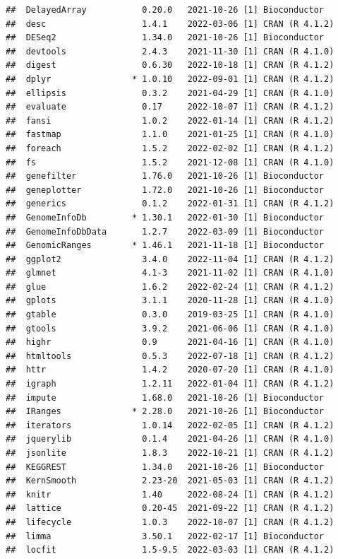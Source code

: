 \documentclass[
]{book}
\begin{document}
\begin{verbatim}
##  DelayedArray           0.20.0   2021-10-26 [1] Bioconductor
##  desc                   1.4.1    2022-03-06 [1] CRAN (R 4.1.2)
##  DESeq2                 1.34.0   2021-10-26 [1] Bioconductor
##  devtools               2.4.3    2021-11-30 [1] CRAN (R 4.1.0)
##  digest                 0.6.30   2022-10-18 [1] CRAN (R 4.1.2)
##  dplyr                * 1.0.10   2022-09-01 [1] CRAN (R 4.1.2)
##  ellipsis               0.3.2    2021-04-29 [1] CRAN (R 4.1.0)
##  evaluate               0.17     2022-10-07 [1] CRAN (R 4.1.2)
##  fansi                  1.0.2    2022-01-14 [1] CRAN (R 4.1.2)
##  fastmap                1.1.0    2021-01-25 [1] CRAN (R 4.1.0)
##  foreach                1.5.2    2022-02-02 [1] CRAN (R 4.1.2)
##  fs                     1.5.2    2021-12-08 [1] CRAN (R 4.1.0)
##  genefilter             1.76.0   2021-10-26 [1] Bioconductor
##  geneplotter            1.72.0   2021-10-26 [1] Bioconductor
##  generics               0.1.2    2022-01-31 [1] CRAN (R 4.1.2)
##  GenomeInfoDb         * 1.30.1   2022-01-30 [1] Bioconductor
##  GenomeInfoDbData       1.2.7    2022-03-09 [1] Bioconductor
##  GenomicRanges        * 1.46.1   2021-11-18 [1] Bioconductor
##  ggplot2                3.4.0    2022-11-04 [1] CRAN (R 4.1.2)
##  glmnet                 4.1-3    2021-11-02 [1] CRAN (R 4.1.0)
##  glue                   1.6.2    2022-02-24 [1] CRAN (R 4.1.2)
##  gplots                 3.1.1    2020-11-28 [1] CRAN (R 4.1.0)
##  gtable                 0.3.0    2019-03-25 [1] CRAN (R 4.1.0)
##  gtools                 3.9.2    2021-06-06 [1] CRAN (R 4.1.0)
##  highr                  0.9      2021-04-16 [1] CRAN (R 4.1.0)
##  htmltools              0.5.3    2022-07-18 [1] CRAN (R 4.1.2)
##  httr                   1.4.2    2020-07-20 [1] CRAN (R 4.1.0)
##  igraph                 1.2.11   2022-01-04 [1] CRAN (R 4.1.2)
##  impute                 1.68.0   2021-10-26 [1] Bioconductor
##  IRanges              * 2.28.0   2021-10-26 [1] Bioconductor
##  iterators              1.0.14   2022-02-05 [1] CRAN (R 4.1.2)
##  jquerylib              0.1.4    2021-04-26 [1] CRAN (R 4.1.0)
##  jsonlite               1.8.3    2022-10-21 [1] CRAN (R 4.1.2)
##  KEGGREST               1.34.0   2021-10-26 [1] Bioconductor
##  KernSmooth             2.23-20  2021-05-03 [1] CRAN (R 4.1.2)
##  knitr                  1.40     2022-08-24 [1] CRAN (R 4.1.2)
##  lattice                0.20-45  2021-09-22 [1] CRAN (R 4.1.2)
##  lifecycle              1.0.3    2022-10-07 [1] CRAN (R 4.1.2)
##  limma                  3.50.1   2022-02-17 [1] Bioconductor
##  locfit                 1.5-9.5  2022-03-03 [1] CRAN (R 4.1.2)

\end{verbatim}
\end{document}
